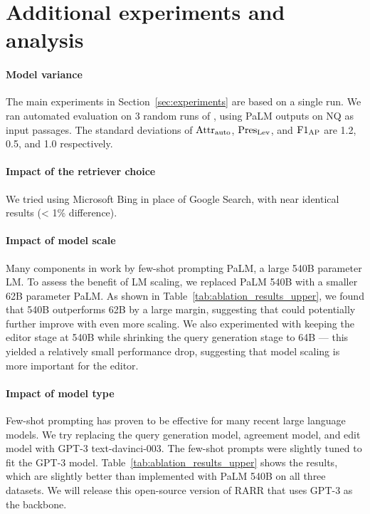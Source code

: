 \section{Additional experiments and analysis} \label{app:more-experiments}


\paragraph{Model variance}
The main experiments in Section~\ref{sec:experiments} are based on a single run.
We ran automated evaluation on 3 random runs of \approach{}, using PaLM outputs on NQ as input passages.
The standard deviations of $\text{Attr}_\text{auto}{}$, $\text{Pres}_\text{Lev}{}$, and $\text{F1}_\text{AP}{}$ are 1.2, 0.5, and 1.0 respectively.

\paragraph{Impact of the retriever choice}
We tried using Microsoft Bing in place of Google Search, with near identical results (< 1\% difference).



\paragraph{Impact of model scale}
Many components in \approach{} work by few-shot prompting PaLM, a large 540B  parameter LM. To assess the benefit of LM scaling, we replaced PaLM 540B with a smaller 62B parameter PaLM. As shown in Table~\ref{tab:ablation_results_upper}, we found that 540B outperforms 62B by a large margin, suggesting that \approach{} could potentially further improve with even more scaling. We also experimented with keeping the editor stage at 540B while shrinking the query generation stage to 64B --- this yielded a relatively small performance drop, suggesting that model scaling is more important for the editor.

\paragraph{Impact of model type}
Few-shot prompting has proven to be effective for many recent large language models. We try replacing the query generation model, agreement model, and edit model with GPT-3 text-davinci-003. The few-shot prompts were slightly tuned to fit the GPT-3 model.
Table~\ref{tab:ablation_results_upper} shows the results, which are slightly better than \approach{} implemented with PaLM 540B on all three datasets.
We will release this open-source version of RARR that uses GPT-3 as the backbone.








